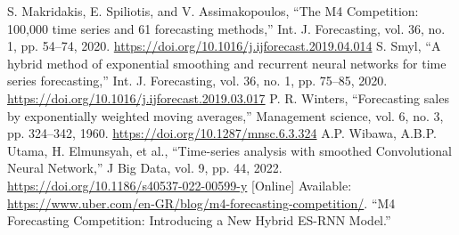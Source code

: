 \documentclass[conference]{IEEEtran}
\begin{document}
\begin{thebibliography}{00}
 S. Makridakis, E. Spiliotis, and V. Assimakopoulos, ``The M4 Competition: 100,000 time series and 61 forecasting methods,'' Int. J. Forecasting, vol. 36, no. 1, pp. 54--74, 2020. \url{https://doi.org/10.1016/j.ijforecast.2019.04.014}
 S. Smyl, ``A hybrid method of exponential smoothing and recurrent neural networks for time series forecasting,'' Int. J. Forecasting, vol. 36, no. 1, pp. 75--85, 2020. \url{https://doi.org/10.1016/j.ijforecast.2019.03.017}
 P. R. Winters, ``Forecasting sales by exponentially weighted moving averages,'' Management science, vol. 6, no. 3, pp. 324--342, 1960. \url{https://doi.org/10.1287/mnsc.6.3.324}
 A.P. Wibawa, A.B.P. Utama, H. Elmunsyah, et al., ``Time-series analysis with smoothed Convolutional Neural Network,'' J Big Data, vol. 9, pp. 44, 2022. \url{https://doi.org/10.1186/s40537-022-00599-y}
 [Online] Available: \url{https://www.uber.com/en-GR/blog/m4-forecasting-competition/}. ``M4 Forecasting Competition: Introducing a New Hybrid ES-RNN Model.''
\end{thebibliography}
\end{document}
